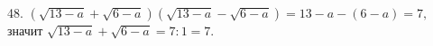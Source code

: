 48. $(\sqrt{13-a}+\sqrt{6-a})(\sqrt{13-a}-\sqrt{6-a})=13-a-(6-a)=7,$ значит $\sqrt{13-a}+\sqrt{6-a}=7:1=7.$\\
